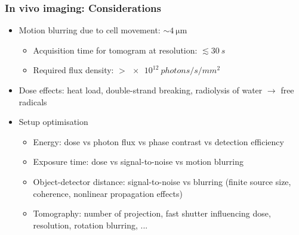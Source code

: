 \documentclass{beamer}
\begin{document}
\begin{frame}
  \frametitle{In vivo imaging: Considerations}
  \begin{itemize}

  \item Motion blurring due to cell movement: $\sim \SI{4}{\micro\metre}$
    \begin{itemize}
    \item Acquisition time for tomogram at  resolution: $\lesssim \SI{30}{s}$
    \item Required flux density: $> \SI{e12}{photons/s/mm^2}$
    \end{itemize}

  \item Dose effects: heat load, double-strand breaking, radiolysis of
    water $\rightarrow$ free radicals
  \item Setup optimisation
    \begin{itemize}
    \item Energy: dose vs photon flux vs phase contrast vs detection efficiency
    \item Exposure time: dose vs signal-to-noise vs motion blurring
    \item Object-detector distance: signal-to-noise vs blurring
      (finite source size, coherence, nonlinear propagation effects)
    \item Tomography: number of projection, fast shutter influencing
      dose, resolution, rotation blurring, ...
    \end{itemize}
  \end{itemize}
\end{frame}
\end{document}
